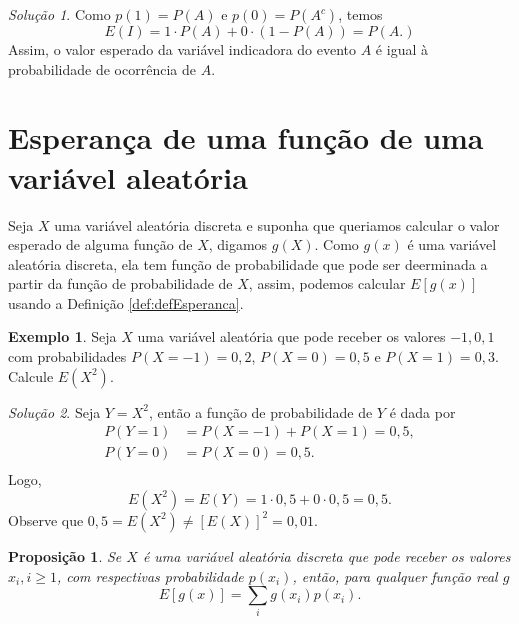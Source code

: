 \documentclass[]{book}
\newtheorem{proposition}{Proposição}[chapter]
\theoremstyle{definition}
\theoremstyle{definition}
\newtheorem{example}{Exemplo}[chapter]
\theoremstyle{definition}
\theoremstyle{remark}
\newtheorem*{solution}{Solução}
\begin{document}
\begin{solution}
\iffalse{} {Solução. } \fi{}Como \(p(1)=P(A)\) e \(p(0)=P(A^c)\), temos
\[E(I)=1\cdot P(A) + 0\cdot (1-P(A)) = P(A.)\]
Assim, o valor esperado da variável indicadora do evento \(A\) é igual à probabilidade de ocorrência de \(A\).
\end{solution}

\hypertarget{esperanuxe7a-de-uma-funuxe7uxe3o-de-uma-variuxe1vel-aleatuxf3ria}{%
\section{Esperança de uma função de uma variável aleatória}\label{esperanuxe7a-de-uma-funuxe7uxe3o-de-uma-variuxe1vel-aleatuxf3ria}}

Seja \(X\) uma variável aleatória discreta e suponha que queriamos calcular o valor esperado de alguma função de \(X\), digamos \(g(X)\).
Como \(g(x)\) é uma variável aleatória discreta, ela tem função de probabilidade que pode ser deerminada a partir da função de probabilidade de \(X\), assim, podemos calcular \(E[g(x)]\) usando a Definição \ref{def:defEsperanca}.

\begin{example}
\protect\hypertarget{exm:exX2}{}{\label{exm:exX2} }Seja \(X\) uma variável aleatória que pode receber os valores \(-1, 0, 1\) com probabilidades \(P(X=-1)=0{,}2\), \(P(X=0)=0{,}5\) e \(P(X=1)=0{,}3\).
Calcule \(E(X^2)\).
\end{example}

\begin{solution}
\iffalse{} {Solução. } \fi{}Seja \(Y=X^2\), então a função de probabilidade de \(Y\) é dada por
\begin{align}
P(Y=1) &= P(X=-1) + P(X=1) = 0{,}5,\\ 
P(Y=0) &= P(X=0) = 0{,}5.\\ 
\end{align}
Logo,
\[E(X^2) = E(Y) = 1\cdot 0{,}5 + 0\cdot 0{,}5 = 0{,}5.\]
Observe que \(0{,}5 = E(X^2) \neq [E(X)]^2 = 0{,}01\).
\end{solution}

\begin{proposition}
\protect\hypertarget{prp:propGx}{}{\label{prp:propGx} }Se \(X\) é uma variável aleatória discreta que pode receber os valores \(x_i, i\geq 1\), com respectivas probabilidade \(p(x_i)\), então, para qualquer função real \(g\)
\[E[g(x)] = \sum_i g(x_i)p(x_i).\]
\end{proposition}
\end{document}
